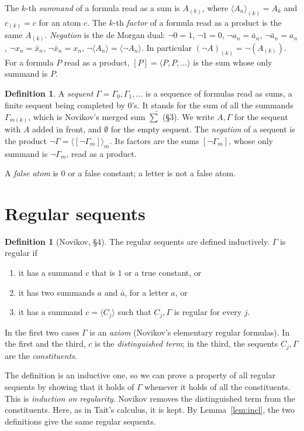\documentclass[11pt]{amsart}
\theoremstyle{definition}
\newtheorem{definition}[theorem]{Definition}
\theoremstyle{remark}
\newcommand{\seq}[1]{\langle #1\rangle}
\newcommand{\one}[1]{[#1]}
\newcommand{\nx}{\bar x}
\begin{document}
The $k$-th \emph{summand} of a formula read as a sum is $A_{(k)}$, where
$\seq{A_n}_{(k)} = A_k$ and $c_{(k)}=c$ for an atom $c$. The
$k$-th \emph{factor} of a formula read as a product is the same
$A_{(k)}$. \emph{Negation} is the de Morgan dual: $\neg 0=1$, $\neg 1=0$,
$\neg a_n=\bar a_n$, $\neg\bar a_n=a_n$, $\neg x_n=\nx_n$,
$\neg\nx_n=x_n$, $\neg\seq{A_n}=\seq{\neg A_n}$. In
particular $(\neg A)_{(k)}=\neg(A_{(k)})$. For a formula $P$ read as a
product, $\one{P}=\seq{P,P,\dots}$ is the sum whose only summand is $P$.

\begin{definition}
  A \emph{sequent} $\Gamma=\Gamma_0,\Gamma_1,\dots$ is a sequence of
  formulas read as sums, a finite sequent being completed by $0$'s. It
  stands for the sum of all the summands $\Gamma_{m(k)}$, which is
  Novikov's merged sum $\widetilde{\sum}$ (\S3). We write $A,\Gamma$ for
  the sequent with $A$ added in front, and $\emptyset$ for the empty
  sequent. The \emph{negation} of a sequent is the product
  $\neg\Gamma=\seq{\one{\neg\Gamma_m}}_m$. Its factors are the sums
  $\one{\neg\Gamma_m}$, whose only summand is $\neg\Gamma_m$, read as a
  product.
\end{definition}

A \emph{false atom} is $0$ or a false constant; a letter is not a false
atom.

\section{Regular sequents}

\begin{definition}[Novikov, \S4]
  The regular sequents are defined inductively. $\Gamma$ is regular if
  \begin{enumerate}
  \item it has a summand $c$ that is $1$ or a true constant, or
  \item it has two summands $a$ and $\bar a$, for a letter $a$, or
  \item it has a summand $c=\seq{C_j}$ such that $C_j,\Gamma$ is regular
    for every $j$.
  \end{enumerate}
  In the first two cases $\Gamma$ is an \emph{axiom} (Novikov's elementary
  regular formulas). In the first and the third, $c$ is the
  \emph{distinguished term}; in the third, the sequents $C_j,\Gamma$ are
  the \emph{constituents}.
\end{definition}

The definition is an inductive one, so we can prove a property of all
regular sequents by showing that it holds of $\Gamma$ whenever it holds of
all the constituents. This is \emph{induction on regularity}. Novikov
removes the distinguished term from the constituents. Here, as in Tait's
calculus, it is kept. By Lemma~\ref{lem:incl}, the two definitions give the
same regular sequents.
\end{document}
